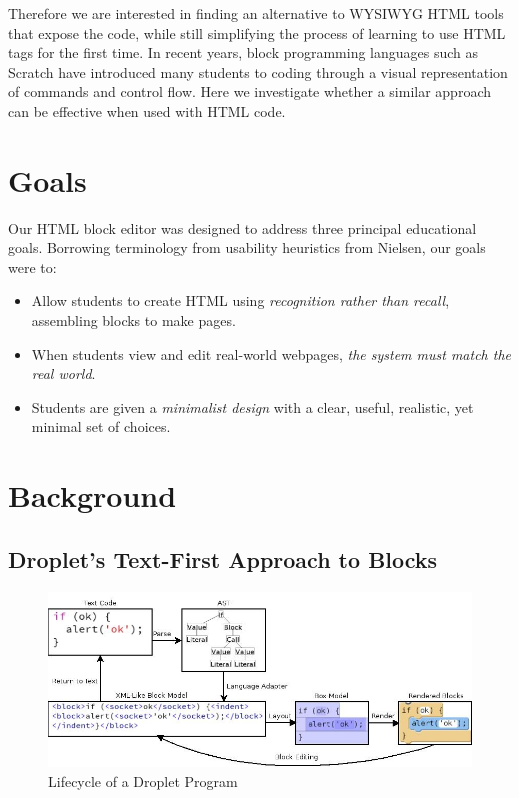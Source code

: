 \documentclass[conference]{IEEEtran}
\begin{document}
Therefore we are interested in finding an alternative to WYSIWYG HTML tools that expose the code, while still simplifying the process of learning to use HTML tags for the first time.  In recent years, block programming languages such as Scratch \cite{Scratch} have introduced many students to coding through a visual representation of commands and control flow.  Here we investigate whether a similar approach can be effective when used with HTML code.

\section{Goals}

Our HTML block editor was designed to address three principal
educational goals.  Borrowing terminology from usability heuristics
from Nielsen, our goals were to:

\begin{itemize}
\item Allow students to create HTML using \emph{recognition rather than recall}, assembling blocks to make pages.
\item When students view and edit real-world webpages, \emph{the system must match the real world}.
\item Students are given a \emph{minimalist design} with a clear, useful, realistic, yet minimal set of choices.
\end{itemize}


\section{Background}

\subsection{Droplet's Text-First Approach to Blocks}

\begin{figure}
\centering
\includegraphics[width=5in]{image11.jpg}
\caption{Lifecycle of a Droplet Program}
\label{lifecycle}
\end{figure}
\end{document}
